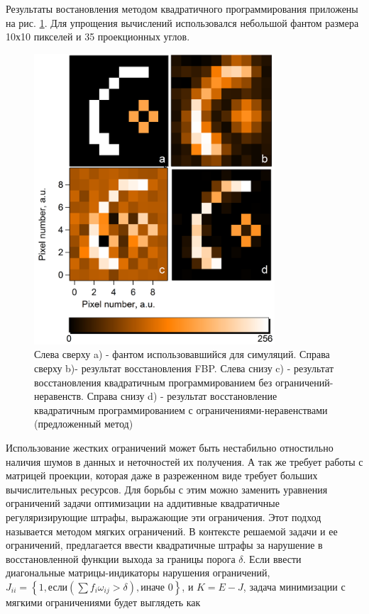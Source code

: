 Результаты востановления методом квадратичного программирования приложены на рис. \ref{im:quadprog}.
Для упрощения вычислений использовался небольшой фантом размера 10х10 пикселей и 35 проекционных углов.

\begin{figure}
  \centering
  \includegraphics[width=0.8\textwidth]{Dissertation/images/part2_img/quadprog}
  \caption{Слева сверху a) - фантом использовавшийся для симуляций. Справа сверху b)- результат восстановления FBP. Слева снизу c) - результат восстановления квадратичным программированием без ограничений-неравенств. Справа снизу d) - результат восстановление квадратичным программированием с ограничениями-неравенствами (предложенный метод)}
  \label{im:quadprog}
\end{figure}

Использование жестких ограничений может быть нестабильно отностильно наличия шумов в данных и неточностей их получения.
А так же требует работы с матрицей проекции, которая даже в разреженном виде требует больших вычислительных ресурсов.
Для борьбы с этим можно заменить уравнения ограничений задачи оптимизации на аддитивные квадратичные регуляризирующие штрафы, выражающие эти ограничения.
Этот подход называется методом мягких ограничений.
В контексте решаемой задачи и ее ограничений, предлагается ввести квадратичные штрафы за нарушение в восстановленной функции выхода за границы порога $\delta$.
Если ввести диагональные матрицы-индикаторы нарушения ограничений, $J_{ii} = \left\{1, \mbox{если} \left(\sum f_{i} \omega_{ij} > \delta \right), \mbox{иначе } 0\right\}$, и $K = E - J$, задача минимизации с мягкими ограничениями будет выглядеть как


